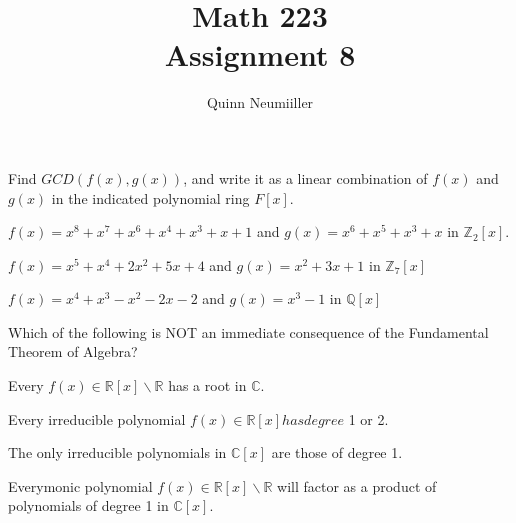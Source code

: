 \documentclass[12pt]{article}
\newcommand{\Z}{\mathbb{Z}}
\newcommand{\R}{\mathbb{R}}
\newcommand{\Q}{\mathbb{Q}}
\newcommand{\C}{\mathbb{C}}
\newenvironment{question}[2][Question]{\begin{trivlist}
\item[\hskip \labelsep {\bfseries #1}\hskip \labelsep {\bfseries #2.}]}{\end{trivlist}}
\begin{document}
 
\title{Math 223 \\
Assignment 8
}
\author{Quinn Neumiiller} 

\maketitle

\begin{question}{1}
Find $GCD(f(x), g(x))$, and write it as a linear combination of $f(x)$ and $g(x)$ in the
indicated polynomial ring $F[x]$.

\begin{question}{1a}$f(x) = x^8 + x^7 + x^6 + x^4 + x^3 + x + 1$ and $g(x) = x^6 + x^5 + x^3 + x$ in $\Z_{2}[x]$.
\end{question}

\begin{question}{1b}$f(x) = x^5 + x^4 + 2x^2 + 5x + 4$ and $g(x) = x^2 + 3x + 1$ in $\Z_{7}[x]$

\end{question}

\begin{question}{1c}$f(x) = x^4 + x^3 - x^2 - 2x - 2$ and $g(x) = x^3 - 1$ in $\Q[x]$
\end{question}

\end{question}
\begin{question}{2}
Which of the following is NOT an immediate consequence of the Fundamental Theorem
of Algebra?

\begin{question}{2a} Every $f(x) \in \R[x] \backslash \R$ has a root in $\C$.
\end{question}
\begin{question}{2b} Every irreducible polynomial $f(x) \in \R[x] has degree$ 1 or 2.
\end{question}
\begin{question}{2c} The only irreducible polynomials in $\C[x]$ are those of degree 1.
\end{question}
\begin{question}{2d} Everymonic polynomial $f(x) \in \R[x] \backslash \R$ will factor as a product of polynomials of degree 1 in $\C[x]$.
\end{question}

\end{question}
\end{document}
